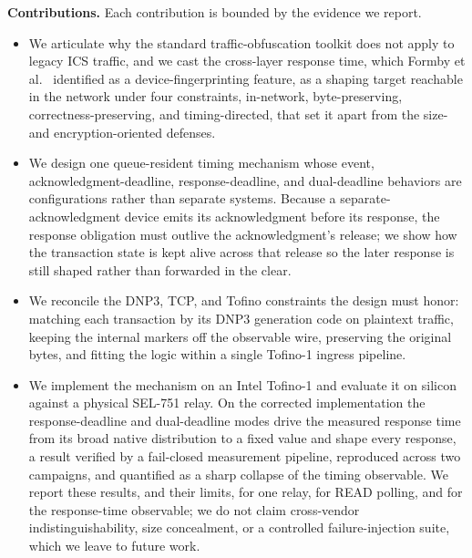 \documentclass[conference]{IEEEtran}
\begin{document}
\noindent\textbf{Contributions.} Each contribution is bounded by the evidence we report.
\begin{itemize}
\item We articulate why the standard traffic-obfuscation toolkit does not apply to legacy ICS traffic,
and we cast the cross-layer response time, which Formby et al.~\cite{formby2016control} identified as a
device-fingerprinting feature, as a shaping target reachable in the network under four constraints,
in-network, byte-preserving, correctness-preserving, and timing-directed, that set it apart from the
size- and encryption-oriented defenses.
\item We design one queue-resident timing mechanism whose event, acknowledgment-deadline,
response-deadline, and dual-deadline behaviors are configurations rather than separate systems. Because
a separate-acknowledgment device emits its acknowledgment before its response, the response obligation
must outlive the acknowledgment's release; we show how the transaction state is kept alive across that
release so the later response is still shaped rather than forwarded in the clear.
\item We reconcile the DNP3, TCP, and Tofino constraints the design must honor: matching each
transaction by its DNP3 generation code on plaintext traffic, keeping the internal markers off the
observable wire, preserving the original bytes, and fitting the logic within a single Tofino-1 ingress
pipeline.
\item We implement the mechanism on an Intel Tofino-1 and evaluate it on silicon against a physical
SEL-751 relay. On the corrected implementation the response-deadline and dual-deadline modes drive the
measured response time from its broad native distribution to a fixed value and shape every response, a
result verified by a fail-closed measurement pipeline, reproduced across two campaigns, and quantified
as a sharp collapse of the timing observable. We report these results, and their limits, for one relay,
for READ polling, and for the response-time observable; we do not claim cross-vendor
indistinguishability, size concealment, or a controlled failure-injection suite, which we leave to
future work.
\end{itemize}



\end{document}
